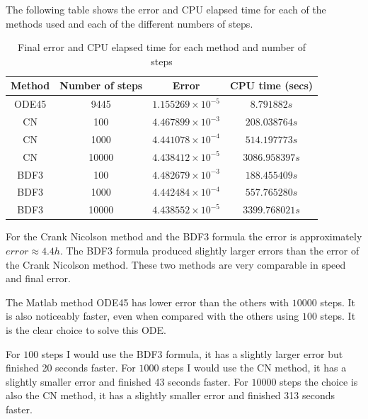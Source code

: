 \documentclass[a4paper, 11pt]{article}
\begin{document}
				The following table shows the error and CPU elapsed time for each of the methods used and each of the different numbers of steps.
				
				\begin{table}[H]
					\centering
					\begin{tabular}{c|c|c|c}
						\textbf{Method} & \textbf{Number of steps} 	& \textbf{Error}  				& \textbf{CPU time (secs)}  	\\ \hline
						ODE45 			& 9445 						& $ 1.155269\times 10^{-5} $ 	& $ 8.791882 s $ 				\\ \hline 
						CN 				& 100 						& $ 4.467899\times 10^{-3} $ 	& $ 208.038764 s $ 				\\ \hline
						CN 				& 1000 						& $ 4.441078\times 10^{-4} $ 	& $ 514.197773 s $ 				\\ \hline
						CN 				& 10000 					& $ 4.438412\times 10^{-5} $ 	& $ 3086.958397 s $				\\ \hline
						BDF3 			& 100				 		& $ 4.482679\times 10^{-3} $ 	& $ 188.455409 s $ 				\\ \hline
						BDF3 			& 1000						& $ 4.442484\times 10^{-4} $ 	& $ 557.765280 s $ 				\\ \hline
						BDF3 			& 10000 					& $ 4.438552\times 10^{-5} $ 	& $ 3399.768021 s $ 			\\ \hline
					\end{tabular}
					\caption{Final error and CPU elapsed time for each method and number of steps}
					\label{table:ex5}
				\end{table}
				
				For the Crank Nicolson method and the BDF3 formula the error is approximately $error \approx 4.4 h$.
				The BDF3 formula produced slightly larger errors than the error of the Crank Nicolson method.
				These two methods are very comparable in speed and final error.
				
				The Matlab method ODE45 has lower error than the others with $ 10000 $ steps.
				It is also noticeably faster, even when compared with the others using $ 100 $ steps.
				It is the clear choice to solve this ODE.
				
				For $100$ steps I would use the BDF3 formula, it has a slightly larger error but finished 20 seconds faster.
				For $1000$ steps I would use the CN method, it has a slightly smaller error and finished 43 seconds faster.
				For $10000$ steps the choice is also the CN method, it has a slightly smaller error and finished 313 seconds faster.
				
\end{document}

